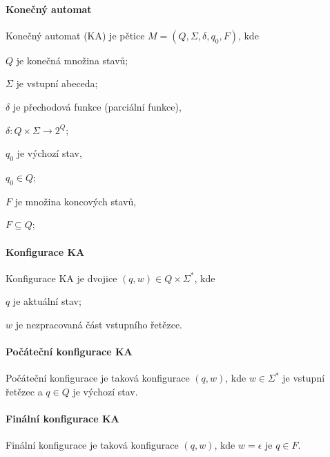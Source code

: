 \paragraph*{Konečný automat} Konečný automat (KA) je pětice $M = (Q, \Sigma, \delta, q_0, F)$, kde \begin{compactitem}
    \item $Q$ je konečná množina stavů;
    \item $\Sigma$ je vstupní abeceda;
    \item $\delta$ je přechodová funkce (parciální funkce), \begin{compactitem}
        \item $\delta : Q \times \Sigma \rightarrow 2^{Q}$;
    \end{compactitem}
    \item $q_0$ je výchozí stav, \begin{compactitem}
        \item $q_0 \in Q$;
    \end{compactitem}
    \item $F$ je množina koncových stavů, \begin{compactitem}
        \item $F \subseteq Q$;
    \end{compactitem}
\end{compactitem}

\paragraph*{Konfigurace KA} Konfigurace KA je dvojice $(q, w) \in Q \times \Sigma^*$, kde \begin{compactitem}
    \item $q$ je aktuální stav;
    \item $w$ je nezpracovaná část vstupního řetězce.
\end{compactitem}

\paragraph*{Počáteční konfigurace KA} Počáteční konfigurace je taková konfigurace $(q, w)$, kde $w \in \Sigma^*$ je vstupní řetězec a $q \in Q$ je výchozí stav.

\paragraph*{Finální konfigurace KA} Finální konfigurace je taková konfigurace $(q, w)$, kde $w = \epsilon$ je $q \in F$.

